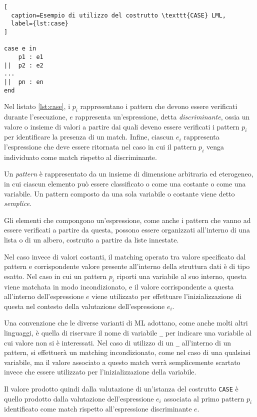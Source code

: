 \newpage

\begin{lstlisting}[
  caption=Esempio di utilizzo del costrutto \texttt{CASE} LML,
  label={lst:case}
]

case e in
    p1 : e1
||  p2 : e2
...
||  pn : en
end

\end{lstlisting}

Nel listato \ref{lst:case}, i $p_i$ rappresentano i pattern che devono essere
verificati durante l'esecuzione, $e$ rappresenta un’espressione, detta
\textit{discriminante}, ossia un valore o insieme di valori a partire dai quali
deveno essere verificati i pattern $p_i$ per identificare la presenza di un
match. Infine, ciascun $e_i$ rappresenta l'espressione che deve essere ritornata
nel caso in cui il pattern $p_i$ venga individuato come match rispetto al
discriminante.

Un \textit{pattern} è rappresentato da un insieme di dimensione arbitraria ed
eterogeneo, in cui ciascun elemento può essere classificato o come una costante
o come una variabile. Un pattern composto da una sola variabile o costante viene
detto \textit{semplice}.

Gli elementi che compongono un'espressione, come anche i pattern che vanno ad
essere verificati a partire da questa, possono essere organizzati all’interno di
una lista o di un albero, costruito a partire da liste innestate.

Nel caso invece di valori costanti, il matching operato tra valore specificato
dal pattern e corrispondente valore presente all'interno della struttura dati è
di tipo esatto. Nel caso in cui un pattern $p_i$ riporti una variabile al suo
interno, questa viene matchata in modo incondizionato, e il valore
corrispondente a questa all’interno dell’espressione $e$ viene utilizzato per
effettuare l’inizializzazione di questa nel contesto della valutazione
dell'espressione $e_i$.

Una convenzione che le diverse varianti di ML adottano, come anche molti altri
linguaggi, è quella di riservare il nome di variabile \texttt{\_} per indicare
una variabile al cui valore non si è interessati. Nel caso di utilizzo di un
\texttt{\_} all’interno di un pattern, si effettuerà un matching incondizionato,
come nel caso di una qualsiasi variabile, ma il valore associato a questo match
verrà semplicemente scartato invece che essere utilizzato per l’inizializzazione
della variabile.

Il valore prodotto quindi dalla valutazione di un'istanza del costrutto
\texttt{CASE} è quello prodotto dalla valutazione dell’espressione $e_i$
associata al primo pattern $p_i$ identificato come match rispetto
all’espressione discriminante $e$.

